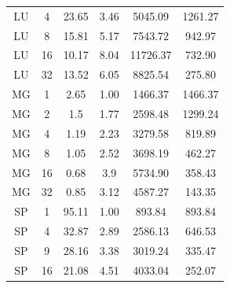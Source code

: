 \documentclass{acm_proc_article-sp}
\begin{document}
\begin{table}[tbp]
\begin{tabular}{ c | c || c | c | c | c }
    LU    & 4     & 23.65 & 3.46  & 5045.09 & 1261.27 \\
    LU    & 8     & 15.81 & 5.17  & 7543.72 & 942.97 \\
    LU    & 16    & 10.17 & 8.04  & 11726.37 & 732.90 \\
    LU    & 32    & 13.52 & 6.05  & 8825.54 & 275.80 \\
    MG    & 1     & 2.65  & 1.00     & 1466.37 & 1466.37 \\
    MG    & 2     & 1.5   & 1.77  & 2598.48 & 1299.24 \\
    MG    & 4     & 1.19  & 2.23  & 3279.58 & 819.89 \\
    MG    & 8     & 1.05  & 2.52  & 3698.19 & 462.27 \\
    MG    & 16    & 0.68  & 3.9   & 5734.90 & 358.43 \\
    MG    & 32    & 0.85  & 3.12  & 4587.27 & 143.35 \\
    SP    & 1     & 95.11 & 1.00     & 893.84 & 893.84 \\
    SP    & 4     & 32.87 & 2.89  & 2586.13 & 646.53 \\
    SP    & 9     & 28.16 & 3.38  & 3019.24 & 335.47 \\
    SP    & 16    & 21.08 & 4.51  & 4033.04 & 252.07 \\
\end{tabular}
\end{table}
\end{document}
